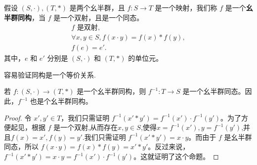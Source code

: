 \documentclass[../../main.tex]{subfiles}
\begin{document}
\begin{definition}[幺半群同构]
假设 $(S, \cdot), (T, *)$ 是两个幺半群，且 $f : S \to T$ 是一个映射，我们称 $f$ 是一个\textbf{幺半群同构}，当 $f$ 是一个双射，且是一个同态。
\begin{gather*}
f \text{ 是双射} ,\\
\forall x, y \in S, f(x \cdot y) = f(x) * f(y) ,\\
f(e) = e' .
\end{gather*}
其中，$e$ 和 $e'$ 分别是 $(S, \cdot)$ 和 $(T, *)$ 的单位元。 
\end{definition}
\begin{remark}
容易验证同构是一个等价关系.
\end{remark}

\begin{proposition}[幺半群同构的逆是幺半群同态]\label{proposition:幺半群同构的逆是幺半群同态}
若 $f : (S, \cdot) \to (T, *)$ 是一个幺半群同构，则 $f^{-1} : T \to S$ 是一个幺半群同态。因此，$f^{-1}$ 也是个幺半群同构。
\end{proposition}
\begin{proof}
令 $x', y' \in T$，我们只需证明 $f^{-1}(x' * y') = f^{-1}(x') \cdot f^{-1}(y')$。为了方便起见，根据 $f$ 是一个双射,从而存在$x,y\in S$,使得$x = f^{-1}(x'), y = f^{-1}(y')$,并且$f(x)=x',f(y)=y'$.我们只需证明 $f^{-1}(x' * y') = x \cdot y$。而由于 $f$ 是幺半群同态，所以 $f(x \cdot y) = f(x) * f(y) = x' * y'$。反过来说，$f^{-1}(x' * y') = x \cdot y = f^{-1}(x') \cdot f^{-1}(y')$。这就证明了这个命题。 
\end{proof}
\end{document}
